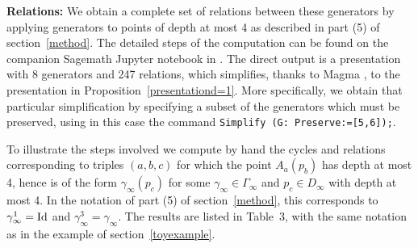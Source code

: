 \documentclass{article}[12pt]
\begin{document}
{\bf Relations:}  We obtain a complete set of relations between these generators by applying generators to points of depth at most 4 as described in part (5) of section~\ref{method}. The detailed steps of the computation can be found on the companion Sagemath Jupyter notebook in \cite{MCode}. The direct output is a presentation with 8 generators and 247 relations, which simplifies, thanks to Magma \cite{Mag}, to the presentation in Proposition~\ref{presentationd=1}. More specifically, we obtain that particular simplification by specifying a subset of the generators which must be preserved, using in this case the command {\tt Simplify (G: Preserve:=[5,6]);}.

To illustrate the steps involved we compute by hand the cycles and relations corresponding to triples $(a,b,c)$ for which the point $A_a(p_b)$ has depth at most 4, hence is of the form $\gamma_\infty (p_c)$ for some $\gamma_\infty \in \Gamma_\infty$ and $p_c \in D_\infty$ with depth at most 4. In the notation of part (5) of section~\ref{method}, this corresponds to $\gamma_\infty^1={\rm Id}$ and  $\gamma_\infty^3=\gamma_\infty$. The results are listed in Table~3, with the same notation as in the example of section~\ref{toyexample}.
\end{document}
